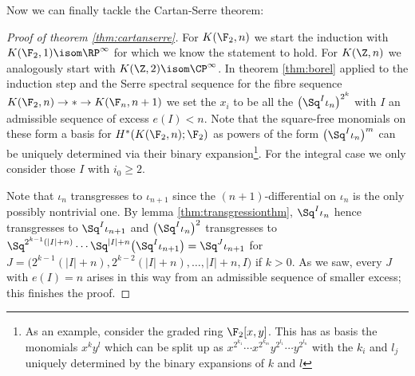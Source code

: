 Now we can finally tackle the Cartan-Serre theorem:
\begin{proof}[Proof of theorem \ref{thm:cartanserre}]
	For $K(\F_2, n)$ we start the induction with $K(\F_2, 1) \isom \RP^\infty$ for which we know the statement to hold.
	For $K(\Z, n)$ we analogously start with $K(\Z, 2) \isom \CP^\infty$.
	In theorem \ref{thm:borel} applied to the induction step and the Serre spectral sequence for the fibre sequence $K(\F_2, n) \to * \to K(\F_n, n + 1)$ we set the $x_i$ to be all the $\big(\Sq^I \iota_n\big)^{2^k}$ with $I$ an admissible sequence of excess $e(I) < n$.
	Note that the square-free monomials on these form a basis for $H^*(K(\F_2, n); \F_2)$ as powers of the form $\big(\Sq^I \iota_n\big)^m$ can be uniquely determined via their binary expansion\footnote{As an example, consider the graded ring $\F_2[x, y]$. This has as basis the monomials $x^k y^l$ which can be split up as $x^{2^{k_1}} \cdots x^{2^{k_m}} y^{2^{l_1}} \cdots y^{2^{l_n}}$ with the $k_i$ and $l_j$ uniquely determined by the binary expansions of $k$ and $l$}.
	For the integral case we only consider those $I$ with $i_0 \geq 2$.

	Note that $\iota_n$ transgresses to $\iota_{n + 1}$ since the $(n + 1)$-differential on $\iota_n$ is the only possibly nontrivial one.
	By lemma \ref{thm:transgressionthm}, $\Sq^I \iota_n$ hence transgresses to $\Sq^I \iota_{n + 1}$ and $\big(\Sq^I \iota_n\big)^2$ transgresses to $\Sq^{2^{k - 1}(|I| + n)} \cdots \Sq^{|I| + n}\big(\Sq^I \iota_{n + 1}\big) = \Sq^J \iota_{n + 1}$ for $J = \big(2^{k - 1}(|I| + n), 2^{k - 2}(|I| + n), \ldots, |I| + n, I\big)$ if $k > 0$.
	As we saw, every $J$ with $e(I) = n$ arises in this way from an admissible sequence of smaller excess; this finishes the proof.
\end{proof}
